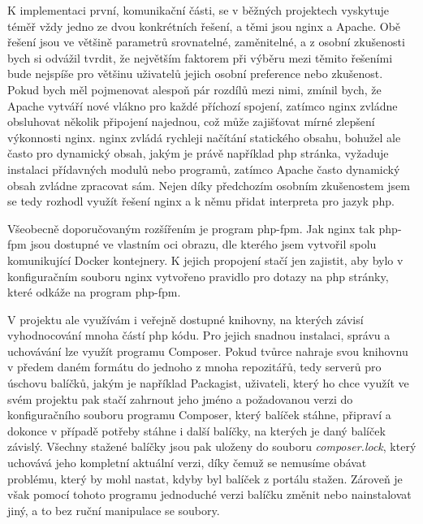 K implementaci první, komunikační části, se v běžných projektech vyskytuje téměř vždy jedno ze dvou konkrétních řešení, a těmi jsou \acrshort{nginx} a Apache. Obě řešení jsou ve většině parametrů srovnatelné, zaměnitelné, a z osobní zkušenosti bych si odvážil tvrdit, že největším faktorem při výběru mezi těmito řešeními bude nejspíše pro většinu uživatelů jejich osobní preference nebo zkušenost. Pokud bych měl pojmenovat alespoň pár rozdílů mezi nimi, zmínil bych, že Apache vytváří nové vlákno pro každé příchozí spojení, zatímco \acrshort{nginx} zvládne obsluhovat několik připojení najednou, což může zajišťovat mírné zlepšení výkonnosti \acrshort{nginx}. \acrshort{nginx} zvládá rychleji načítání statického obsahu, bohužel ale často pro dynamický obsah, jakým je právě například \acrshort{php} stránka, vyžaduje instalaci přídavných modulů nebo programů, zatímco Apache často dynamický obsah zvládne zpracovat sám. Nejen díky předchozím osobním zkušenostem jsem se tedy rozhodl využít řešení \acrshort{nginx} a k němu přidat interpreta pro jazyk \acrshort{php}.

Všeobecně doporučovaným rozšířením je program \acrshort{php-fpm}. Jak \acrshort{nginx} tak \acrshort{php-fpm} jsou dostupné ve vlastním \acrshort{oci} obrazu, dle kterého jsem vytvořil spolu komunikující Docker kontejnery. K jejich propojení stačí jen zajistit, aby bylo v konfiguračním souboru \acrshort{nginx} vytvořeno pravidlo pro dotazy na \acrshort{php} stránky, které odkáže na program \acrshort{php-fpm}.

V projektu ale využívám i veřejně dostupné knihovny, na kterých závisí vyhodnocování mnoha částí \acrshort{php} kódu. Pro jejich snadnou instalaci, správu a uchovávání lze využít programu Composer. Pokud tvůrce nahraje svou knihovnu v předem daném formátu do jednoho z mnoha repozitářů, tedy serverů pro úschovu balíčků, jakým je například Packagist, uživateli, který ho chce využít ve svém projektu pak stačí zahrnout jeho jméno a požadovanou verzi do konfiguračního souboru programu Composer, který balíček stáhne, připraví a dokonce v případě potřeby stáhne i další balíčky, na kterých je daný balíček závislý. Všechny stažené balíčky jsou pak uloženy do souboru \emph{composer.lock}, který uchovává jeho kompletní aktuální verzi, díky čemuž se nemusíme obávat problému, který by mohl nastat, kdyby byl balíček z portálu stažen. Zároveň je však pomocí tohoto programu jednoduché verzi balíčku změnit nebo nainstalovat jiný, a to bez ruční manipulace se soubory.

